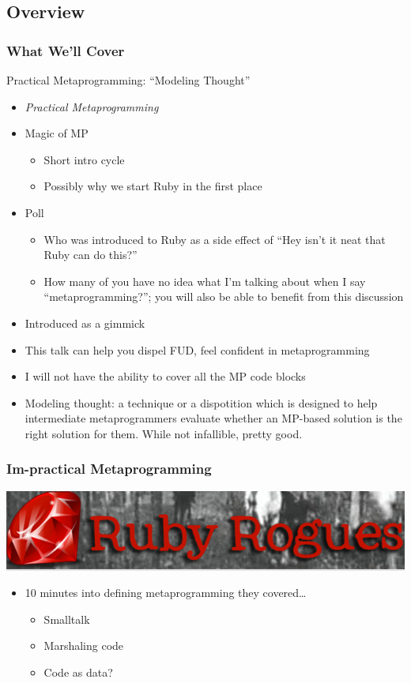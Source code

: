 \documentclass[slidestop,compress,mathserif]{beamer}
\begin{document}
\subsection{Overview}

\begin{frame}
	\frametitle{What We'll Cover}
	\begin{center}
		Practical Metaprogramming:  ``Modeling Thought''
	\end{center}
\end{frame}
\note
{
\tiny
\begin{itemize}
	\item \emph{Practical Metaprogramming}
	\item Magic of MP
	\begin{itemize}
		\tiny
		\item Short intro cycle
		\item Possibly why we start Ruby in the first place
	\end{itemize}
	\item Poll
	\begin{itemize}
		\tiny
		\item Who was introduced to Ruby as a side effect of ``Hey isn't it neat that Ruby can do this?''
		\item How many of you have no idea what I'm talking about when I say ``metaprogramming?''; you will also be able to benefit from this discussion
	\end{itemize}
	\item Introduced as a gimmick
	\item This talk can	help you dispel FUD, feel confident in metaprogramming
	\item I	will not have the ability to cover all the MP code blocks
	\item Modeling thought: a technique or a dispotition which is designed to help intermediate metaprogrammers evaluate whether an MP-based
	solution is the right solution for them.  While not infallible, pretty good.
\end{itemize}
\normalsize
}

\begin{frame}
	\frametitle{\textbf{Im}-practical Metaprogramming}
	\pause
	\begin{center}
		\includegraphics[scale=0.3]{img/rubyrogues.png}
	\end{center}
	\begin{itemize}
		\item 10 minutes into defining metaprogramming they covered{\ldots}
		\begin{itemize}
			\item Smalltalk
			\pause
			\item Marshaling code 
			\pause
			\item Code as data?
		\end{itemize}
	\end{itemize}
\end{frame}
\end{document}
